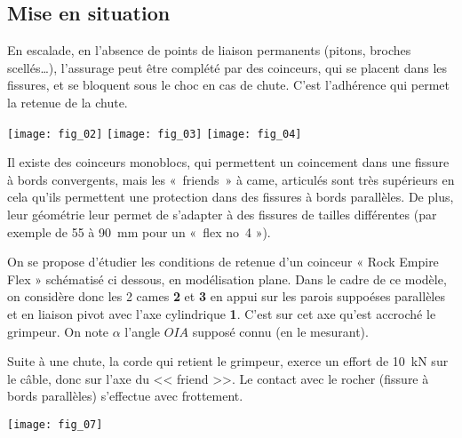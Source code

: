 
\subsection*{Mise en situation}

En escalade, en l’absence de points de liaison permanents (pitons, broches scellés…), l’assurage peut être complété par des coinceurs, qui se placent dans les fissures, et se bloquent sous le choc en cas de chute. C’est l’adhérence qui permet la retenue de la chute.
\begin{center}
\texttt{[image: fig\_02]}
\texttt{[image: fig\_03]}
\texttt{[image: fig\_04]}
\end{center}
Il existe des coinceurs monoblocs, qui permettent un coincement dans une fissure à bords convergents, mais les 
«~friends~» à came, articulés sont très supérieurs en cela qu’ils permettent une protection dans des fissures à bords parallèles. De plus, leur géométrie leur permet de s’adapter à des fissures de tailles différentes (par exemple de 55 à \SI{90}{mm} pour un «~flex no~4 »).

On se propose d’étudier les conditions de retenue d’un coinceur « Rock Empire Flex » schématisé ci dessous, en modélisation plane. Dans le cadre de ce modèle, on considère donc les 2 cames \textbf{2} et \textbf{3} en appui sur les parois suppoéses parallèles et en liaison pivot avec l'axe cylindrique \textbf{1}. C'est sur cet axe qu'est accroché le grimpeur.  
On note $\alpha$ l'angle $OIA$ supposé connu (en le mesurant). 


Suite à une chute, la corde qui retient le grimpeur, exerce un effort de \SI{10}{kN} sur le câble, donc
sur l’axe du << friend >>. Le contact avec le rocher (fissure à bords parallèles) s’effectue avec
frottement.


\begin{center}
\texttt{[image: fig\_07]}
\end{center}

\ifprof
\begin{corrige}~\\
\end{corrige}
\else
\fi


\ifprof
\begin{corrige}~\\
\end{corrige}
\else
\fi

